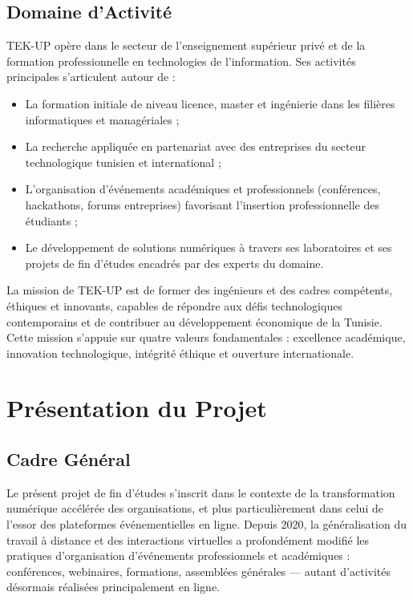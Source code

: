 \subsection{Domaine d'Activité}
TEK-UP opère dans le secteur de l'enseignement supérieur privé et de la formation professionnelle en technologies de l'information. Ses activités principales s'articulent autour de :
\begin{itemize}
    \item La formation initiale de niveau licence, master et ingénierie dans les filières informatiques et managériales ;
    \item La recherche appliquée en partenariat avec des entreprises du secteur technologique tunisien et international ;
    \item L'organisation d'événements académiques et professionnels (conférences, hackathons, forums entreprises) favorisant l'insertion professionnelle des étudiants ;
    \item Le développement de solutions numériques à travers ses laboratoires et ses projets de fin d'études encadrés par des experts du domaine.
\end{itemize}

La mission de TEK-UP est de former des ingénieurs et des cadres compétents, éthiques et innovants, capables de répondre aux défis technologiques contemporains et de contribuer au développement économique de la Tunisie. Cette mission s'appuie sur quatre valeurs fondamentales : excellence académique, innovation technologique, intégrité éthique et ouverture internationale.

\section{Présentation du Projet}

\subsection{Cadre Général}
Le présent projet de fin d'études s'inscrit dans le contexte de la transformation numérique accélérée des organisations, et plus particulièrement dans celui de l'essor des plateformes événementielles en ligne. Depuis 2020, la généralisation du travail à distance et des interactions virtuelles a profondément modifié les pratiques d'organisation d'événements professionnels et académiques : conférences, webinaires, formations, assemblées générales — autant d'activités désormais réalisées principalement en ligne.

